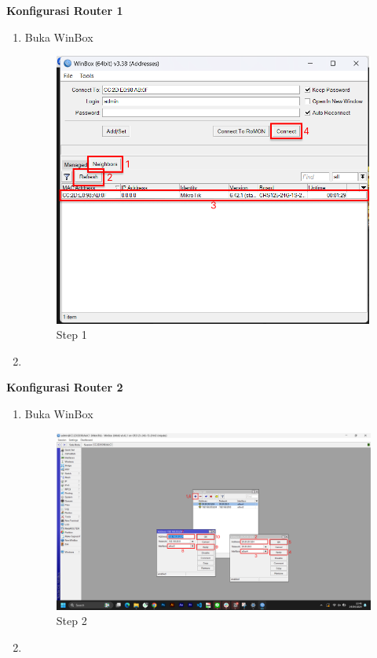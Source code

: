 \begin{center}
    \textbf{Konfigurasi Router 1}
    \begin{enumerate}
        \item Buka WinBox
        \begin{figure}[H]
			\centering
			\includegraphics[width=0.8\linewidth]{P3/img/per1/pc1/Step 1.png}
			\caption{Step 1}
			\label{fig:Step 1(Per.1 PC1)}
		\end{figure}
        \item 
    \end{enumerate}

    \textbf{Konfigurasi Router 2}
    \begin{enumerate}
        \item Buka WinBox
        \begin{figure}[H]
			\centering
			\includegraphics[width=0.8\linewidth]{P3/img/per1/pc2/Step 2.png}
			\caption{Step 2}
			\label{fig:Step 2(Per.1 PC2)}
		\end{figure}
        \item 
    \end{enumerate}


\end{center}
